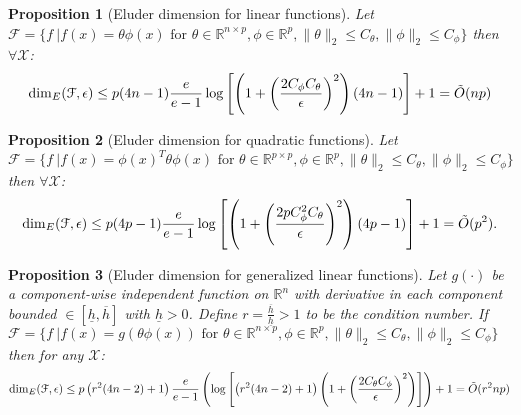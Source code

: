 \documentclass{article}
\newtheorem{prop}{Proposition}
\newcommand{\Real}{\mathds{R}}
\newcommand{\Xc}{\mathcal{X}}
\newcommand{\Fc}{\mathcal{F}}
\begin{document}
\begin{prop}[Eluder dimension for linear functions]
\label{prop: eluder lin}
\hspace{0.00000000000001mm} \newline
Let $\mathcal{F} = \{ f \ | f(x) = \theta \phi(x)  \text{ for } \theta \in \Real^{n \times p}, \phi \in \Real^p ,
\|\theta \|_2 \le C_\theta , \|\phi\|_2 \le C_\phi \}$
then $\forall \mathcal{X}$:
$$ {\rm dim}_E(\Fc, \epsilon) \le p(4n-1)\frac{e}{e-1} \log\left[ \left(1+\left( \frac{2C_\phi C_\theta}{\epsilon}\right)^2 \right)\left(4n-1\right) \right] + 1 = \tilde{O}(np) $$
\end{prop}

\begin{prop}[Eluder dimension for quadratic functions]
\hspace{0.00000000000001mm} \newline
Let $\mathcal{F} = \{ f \ | f(x) = \phi(x)^T \theta \phi(x)  \text{ for } \theta \in \Real^{p \times p}, \phi \in \Real^p ,
\|\theta \|_2 \le C_\theta , \|\phi\|_2 \le C_\phi \}$
then $\forall \Xc$:
$$ {\rm dim}_E(\Fc, \epsilon) \le p(4p-1)\frac{e}{e-1} \log\left[ \left(1+\left( \frac{2 p C_\phi^2 C_\theta}{\epsilon}\right)^2 \right)\left(4p-1\right) \right] + 1 = \tilde{O}(p^2). $$
\end{prop}

\begin{prop}[Eluder dimension for generalized linear functions]
\hspace{0.00000000000001mm} \newline
Let $g(\cdot)$ be a component-wise independent function on $\Real^n$ with derivative in each component bounded  $\in [\underline{h},\overline{h}]$ with $\underline{h}>0$.
Define $r = \frac{\overline{h}}{\underline{h}} > 1$ to be the condition number.
If $\mathcal{F} = \{ f \ | f(x) = g(\theta \phi(x))  \text{ for } \theta \in \Real^{n \times p}, \phi \in \Real^p ,
\|\theta \|_2 \le C_\theta , \|\phi\|_2 \le C_\phi \}$
then for any $\Xc$:
$${\rm dim}_E(\Fc, \epsilon) \le p \left(r^2(4n-2)+1\right)\frac{e}{e-1} \left(\log \left[\left(r^2(4n-2)+1 \right) \left(1+ \left(\frac{2C_\theta C_\phi}{\epsilon} \right)^2\right) \right] \right) + 1 = \tilde{O}(r^2 np)$$
\end{prop}

\end{document}

